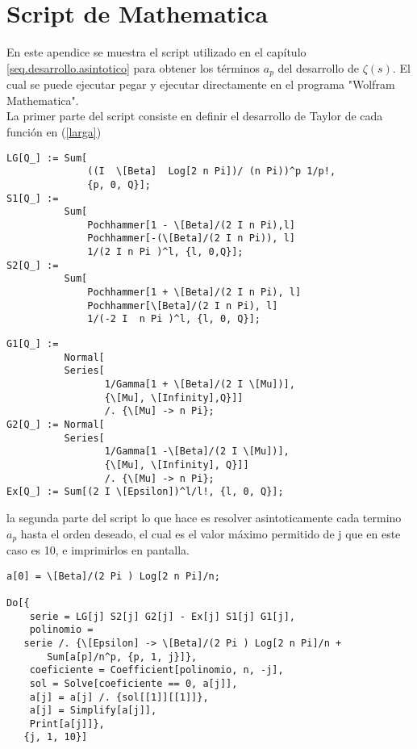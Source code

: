 \chapter{Script de Mathematica}\label{Apendice.1}

En este apendice se muestra el script utilizado en el capítulo \ref{seq.desarrollo.asintotico} para obtener los términos $a _p$ del desarrollo de $\zeta (s)$. El cual se puede ejecutar pegar y ejecutar  directamente en el programa "Wolfram Mathematica".\\



La primer parte del script consiste en definir el desarrollo de Taylor de cada función  en (\ref{larga})
\begin{verbatim}
LG[Q_] := Sum[
              ((I  \[Beta]  Log[2 n Pi])/ (n Pi))^p 1/p!, 
              {p, 0, Q}];
S1[Q_] := 
          Sum[
              Pochhammer[1 - \[Beta]/(2 I n Pi),l] 
              Pochhammer[-(\[Beta]/(2 I n Pi)), l] 
              1/(2 I n Pi )^l, {l, 0,Q}];
S2[Q_] := 
          Sum[
              Pochhammer[1 + \[Beta]/(2 I n Pi), l] 
              Pochhammer[\[Beta]/(2 I n Pi), l] 
              1/(-2 I  n Pi )^l, {l, 0, Q}];
\end{verbatim}
\newpage
\begin{verbatim}
G1[Q_] := 
          Normal[
          Series[
                 1/Gamma[1 + \[Beta]/(2 I \[Mu])], 
                 {\[Mu], \[Infinity],Q}]] 
                 /. {\[Mu] -> n Pi};
G2[Q_] := Normal[
          Series[
                 1/Gamma[1 -\[Beta]/(2 I \[Mu])], 
                 {\[Mu], \[Infinity], Q}]] 
                 /. {\[Mu] -> n Pi};
Ex[Q_] := Sum[(2 I \[Epsilon])^l/l!, {l, 0, Q}];
\end{verbatim}
la segunda parte del script lo que hace es resolver asintoticamente cada termino $a_p$ hasta el orden deseado, el cual es el valor máximo permitido de j que en este caso es 10, e imprimirlos en pantalla.
\begin{verbatim}
a[0] = \[Beta]/(2 Pi ) Log[2 n Pi]/n;

Do[{
  	serie = LG[j] S2[j] G2[j] - Ex[j] S1[j] G1[j],
  	polinomio = 
   serie /. {\[Epsilon] -> \[Beta]/(2 Pi ) Log[2 n Pi]/n + 
       Sum[a[p]/n^p, {p, 1, j}]},
  	coeficiente = Coefficient[polinomio, n, -j],
  	sol = Solve[coeficiente == 0, a[j]],
  	a[j] = a[j] /. {sol[[1]][[1]]},
  	a[j] = Simplify[a[j]],
  	Print[a[j]]},
   {j, 1, 10}]
\end{verbatim}